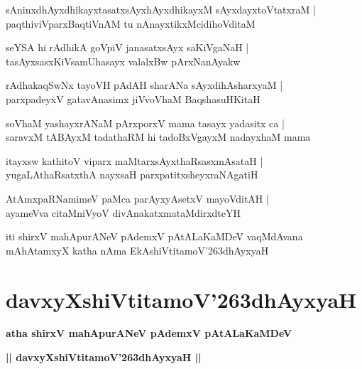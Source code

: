 \documentclass[twoside,12pt,openright]{book}
\def\S{\char'263}
\newcounter{shloka}[chapter]
\begin{document}
\begin{shloka}%
sAninxdhAyxdhikayxtasatxsAyxhAyxdhikayxM sAyxdayxtoVtatxraM |\\
paqthiviVparxBaqtiVnAM tu nAnayxtikxMcidihoVditaM 
\end{shloka}

\begin{shloka}%
seYSA hi rAdhikA goVpiV janasatxsAyx saKiVgaNaH |\\
tasAyxsasxKiVsamUhasayx valalxBw pArxNanAyakw
\end{shloka}

\begin{shloka}%
rAdhakaqSwNx tayoVH pAdAH sharANa sAyxdihAsharxyaM |\\
parxpadeyxV gatavAnasimx jiVvoVhaM BaqshasuHKitaH 
\end{shloka}

\begin{shloka}%
soVhaM yashayxrANaM pArxporxV mama tasayx yadasitx ca |\\
saravxM tABAyxM tadathaRM hi tadoBxVgayxM nadayxhaM mama 
\end{shloka}

\begin{shloka}%
itayxsw kathitoV viparx maMtarxsAyxthaRsasxmAsataH |\\
yugaLAthaRsatxthA nayxsaH parxpatitxsheyxraNAgatiH
\end{shloka}

\begin{shloka}%
AtAmxpaRNamimeV paMca parAyxyAsetxV mayoVditAH |\\
ayameVva citaMniVyoV divAnakatxmataMdirxdteYH
\end{shloka}

\begin{center}
iti shirxV mahApurANeV pAdemxV pAtALaKaMDeV vaqMdAvana mAhAtamxyX katha nAma  
EkAshiVtitamoV\S dhAyxyaH
\end{center}

\chapter{davxyXshiVtitamoV\S dhAyxyaH}

\begin{center}
{\LARGE\bfseries atha shirxV mahApurANeV pAdemxV pAtALaKaMDeV }
\end{center}

\begin{center}         
{\LARGE\bfseries || davxyXshiVtitamoV\S dhAyxyaH ||}
\end{center}
\end{document}
